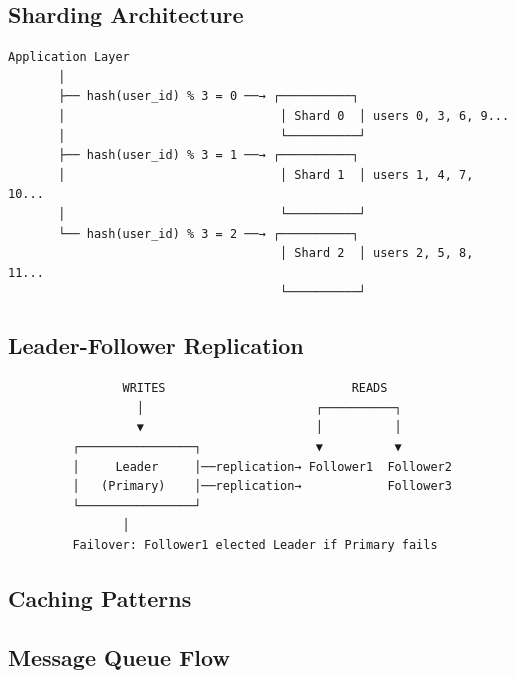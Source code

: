 \documentclass[11pt]{article}
\begin{document}
\subsection{Sharding Architecture}\label{sharding-architecture}

\setcodelang{}

\begin{verbatim}
Application Layer
       │
       ├── hash(user_id) % 3 = 0 ──→ ┌──────────┐
       │                              │ Shard 0  │ users 0, 3, 6, 9...
       │                              └──────────┘
       ├── hash(user_id) % 3 = 1 ──→ ┌──────────┐
       │                              │ Shard 1  │ users 1, 4, 7, 10...
       │                              └──────────┘
       └── hash(user_id) % 3 = 2 ──→ ┌──────────┐
                                      │ Shard 2  │ users 2, 5, 8, 11...
                                      └──────────┘
\end{verbatim}

\subsection{Leader-Follower Replication}\label{leader-follower-replication}

\setcodelang{}

\begin{verbatim}
                WRITES                          READS
                  │                        ┌──────────┐
                  ▼                        │          │
         ┌────────────────┐                ▼          ▼
         │     Leader     │──replication→ Follower1  Follower2
         │   (Primary)    │──replication→            Follower3
         └────────────────┘
                │
         Failover: Follower1 elected Leader if Primary fails
\end{verbatim}

\subsection{Caching Patterns}\label{caching-patterns}


\subsection{Message Queue Flow}\label{message-queue-flow}
\end{document}
